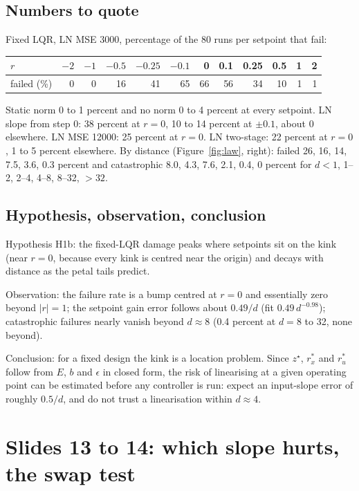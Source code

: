 \documentclass[11pt]{article}
\begin{document}
\subsection{Numbers to quote}
Fixed LQR, LN MSE 3000, percentage of the 80 runs per setpoint that fail:
\begin{center}
\begin{tabular}{lrrrrrrrrrrr}
\toprule
$r$ & $-2$ & $-1$ & $-0.5$ & $-0.25$ & $-0.1$ & 0 & 0.1 & 0.25 & 0.5 & 1 & 2 \\
\midrule
failed (\%) & 0 & 0 & 16 & 41 & 65 & 66 & 56 & 34 & 10 & 1 & 1 \\
\bottomrule
\end{tabular}
\end{center}
Static norm 0 to 1 percent and no norm 0 to 4 percent at every setpoint. LN slope from step 0: 38 percent at $r=0$, 10 to 14 percent at $\pm0.1$, about 0 elsewhere. LN MSE 12000: 25 percent at $r=0$. LN two-stage: 22 percent at $r=0$, 1 to 5 percent elsewhere. By distance (Figure~\ref{fig:law}, right): failed 26, 16, 14, 7.5, 3.6, 0.3 percent and catastrophic 8.0, 4.3, 7.6, 2.1, 0.4, 0 percent for $d<1$, 1--2, 2--4, 4--8, 8--32, $>32$.

\subsection{Hypothesis, observation, conclusion}
Hypothesis H1b: the fixed-LQR damage peaks where setpoints sit on the kink (near $r=0$, because every kink is centred near the origin) and decays with distance as the petal tails predict.

Observation: the failure rate is a bump centred at $r=0$ and essentially zero beyond $|r|=1$; the setpoint gain error follows about $0.49/d$ (fit $0.49\,d^{-0.98}$); catastrophic failures nearly vanish beyond $d\approx8$ (0.4 percent at $d=8$ to 32, none beyond).

Conclusion: for a fixed design the kink is a location problem. Since $z^\star$, $r^*_x$ and $r^*_u$ follow from $E$, $b$ and $\epsilon$ in closed form, the risk of linearising at a given operating point can be estimated before any controller is run: expect an input-slope error of roughly $0.5/d$, and do not trust a linearisation within $d\approx4$.

\section{Slides 13 to 14: which slope hurts, the swap test}\label{sec:s7}
\end{document}
